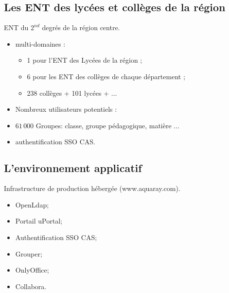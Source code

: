\subsection{Les ENT des lycées et collèges de la région}
\begin{frame}{\sub}

ENT du $2^{nd}$ degrés de la région centre.

\begin{itemize}
\item multi-domaines :
	\begin{itemize}
		\item 1 pour l'ENT des Lycées de la région ;
		\item 6 pour les  ENT des collèges de chaque département ;
		\item 238 collèges + 101 lycées + ...  
	\end{itemize}
	
\item Nombreux utilisateurs potentiels :
\item  $61\,000$ Groupes: classe, groupe pédagogique, matière ...  
\item authentification SSO CAS.
\end{itemize}

\end{frame}

\subsection{L'environnement applicatif}
\begin{frame}{\sub}
Infrastructure de production hébergée  {\tiny(www.aquaray.com)}.
\begin{itemize}
	\item OpenLdap;
	\item Portail uPortal;
	\item Authentification SSO CAS;
	\item Grouper;
	\item OnlyOffice;
	\item Collabora.
	
\end{itemize}
\end{frame}
